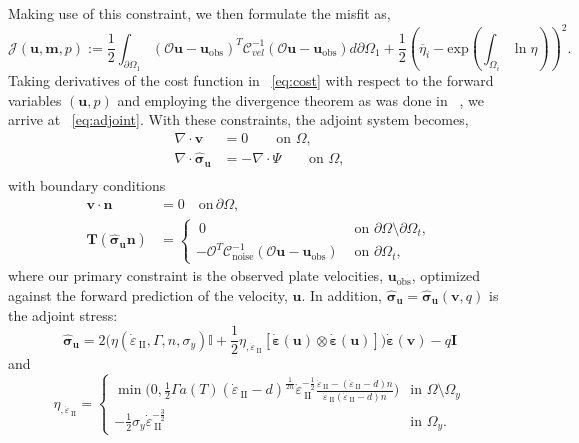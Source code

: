 \documentclass[12pt]{article}
\newcommand{\IIinv}{{\dot\varepsilon}_{\mathrm{\!\!\:II}}}
\newcommand{\mm}{{\ensuremath{\boldsymbol{m}}}}
\newcommand{\uu}{{\ensuremath{\boldsymbol{u}}}}
\newcommand{\vv}{{\ensuremath{\boldsymbol{v}}}}
\newcommand{\ssigma}{{\ensuremath{\boldsymbol{\sigma}}}}
\newcommand{\strain}{{\ensuremath{\dot{\boldsymbol{\varepsilon}}}}}
\begin{document}
Making use of this constraint, we then formulate the misfit as,
\begin{equation}
  \mathcal{J}(\uu,\mm,p):= \frac{1}{2}\int_{\partial \Omega_1} (\mathcal{O}\uu-\uu_{\text{obs}})^T\mathcal{C}^{-1}_{vel}(\mathcal{O}\uu-\uu_{\text{obs}})d\partial\Omega_1 
   +\frac{1}{2}(\overline{\eta}_i - \text{exp}({\int_{\Omega_i} \ln \eta}))^{2}.
\label{eq:cost}
\end{equation}
Taking derivatives of the cost function in ~\eqref{eq:cost} with respect to the forward variables $(\uu,p)$ and employing the divergence theorem as was done in ~\citep{ratnaswamy2015adjoint}, we arrive at ~\eqref{eq:adjoint}.
With these constraints, the adjoint system becomes,
\begin{equation}
  \label{eq:adjoint}
  \begin{split}
    \nabla \cdot \vv &=0 \qquad  \text{on } \Omega, \\
    \nabla \cdot \hat \ssigma_\uu&=-\nabla \cdot \Psi   \qquad \text{on } \Omega, \\
  \end{split}
\end{equation}
with boundary conditions
\begin{align*}
  \vv\cdot \textbf{n}&=0 \quad \text{on} \, \partial \Omega, \\
  \textbf{T}(\hat\ssigma_\uu \textbf{n})
  &=\begin{cases} \:0 & \text{ on }\partial \Omega\setminus
  \partial\Omega_t, \\
  -\mathcal{O}^T\mathcal{C}^{-1}_{\text{noise}}(\mathcal O \uu-\uu_{\text{obs}}) &\text{ on }
  \partial\Omega_t,
  \end{cases}
  \label{eq:adjoint}
\end{align*}
where our primary constraint is the observed plate velocities, $\uu_{\text{obs}}$, optimized against the forward prediction of the velocity, $\uu$. In addition, $\hat\ssigma_\uu = \hat\ssigma_\uu(\vv,q)$ is the adjoint stress: 
\begin{equation}\label{eq:sigma_hat}
\hat\ssigma_\uu  = 2 \Big(\eta(\IIinv,\Gamma, n,
\sigma_y)\mathbb{I}+\frac{1}{2} \eta_{,\IIinv} [\strain(\uu)\otimes
      \strain(\uu)]\Big)\strain(\vv) -q\textbf{I}
\end{equation}
and
\begin{equation}
  \eta_{,\IIinv} \!\!=\!\!
  \begin{cases}
   \min\!\Big(0, \frac{1}{2}\Gamma
   a(T)(\IIinv-d)^{\frac{1}{2n}}\IIinv^{-\frac{1}{2}}\frac{\IIinv-(\IIinv-d)n}{\IIinv(\IIinv-d)n}\Big)
   &\text{in } \Omega\setminus\Omega_y 
   \\
   -\frac{1}{2}\sigma_{y}\IIinv^{-\frac{3}{2}}  &\text{in } \Omega_y.
  \end{cases}
\end{equation}
\end{document}
